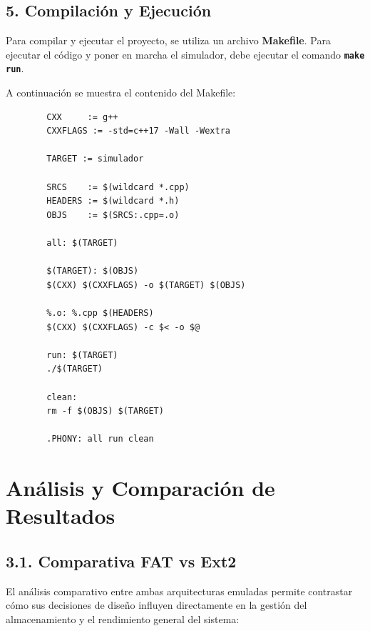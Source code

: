 \documentclass[12pt,a4paper]{article}
\begin{document}
	\subsection{5. Compilación y Ejecución}
	Para compilar y ejecutar el proyecto, se utiliza un archivo \textbf{Makefile}. Para ejecutar el código y poner en marcha el simulador, debe ejecutar el comando \textbf{\texttt{make run}}.
	
	A continuación se muestra el contenido del Makefile:
	
	\begin{verbatim}
		CXX     := g++
		CXXFLAGS := -std=c++17 -Wall -Wextra
		
		TARGET := simulador
		
		SRCS    := $(wildcard *.cpp)
		HEADERS := $(wildcard *.h)
		OBJS    := $(SRCS:.cpp=.o)
		
		all: $(TARGET)
		
		$(TARGET): $(OBJS)
		$(CXX) $(CXXFLAGS) -o $(TARGET) $(OBJS)
		
		%.o: %.cpp $(HEADERS)
		$(CXX) $(CXXFLAGS) -c $< -o $@
		
		run: $(TARGET)
		./$(TARGET)
		
		clean:
		rm -f $(OBJS) $(TARGET)
		
		.PHONY: all run clean
	\end{verbatim}
	
	\section{Análisis y Comparación de Resultados}
	
	\subsection{3.1. Comparativa FAT vs Ext2}
	
	El análisis comparativo entre ambas arquitecturas emuladas permite contrastar cómo sus decisiones de diseño influyen directamente en la gestión del almacenamiento y el rendimiento general del sistema:
	
\end{document}
